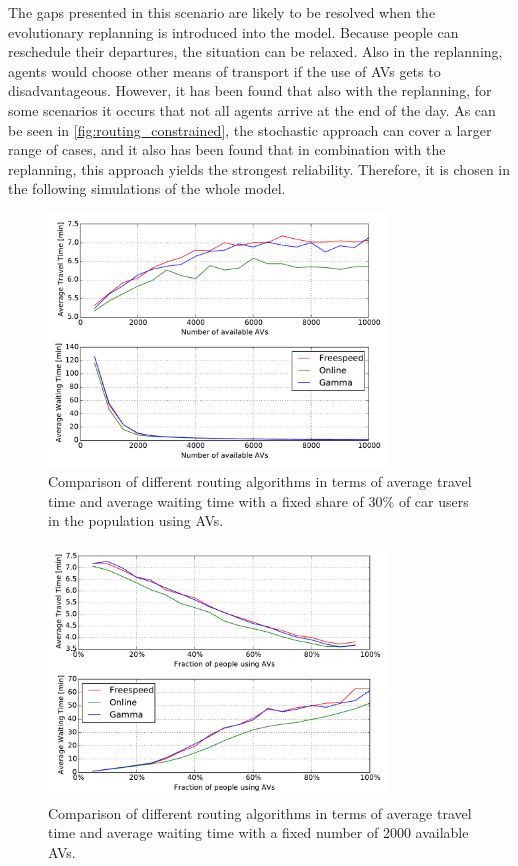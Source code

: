 The gaps presented in this scenario are likely to be resolved when the evolutionary
replanning is introduced into the model. Because people can reschedule
their departures, the situation can be relaxed. Also in the replanning, agents would
choose other means of transport if the use of AVs gets to disadvantageous. However,
it has been found that also with the replanning, for some scenarios it occurs that
not all agents arrive at the end of the day. As can be seen in \cref{fig:routing_constrained},
the stochastic approach can cover a larger range of cases, and it also has
been found that in combination with the replanning, this approach yields the strongest
reliability. Therefore, it is chosen in the following simulations of the whole
model.

\begin{figure}
    \centering
    \includegraphics[width=0.8\textwidth]{figures/relaxed_routing_fraction.pdf}
    \caption{Comparison of different routing algorithms in terms of average travel time and average
    waiting time with a fixed share of 30\% of car users in the population using AVs.}
    \label{fig:relaxed_routing_fraction}
\end{figure}

\begin{figure}
    \centering
    \includegraphics[width=0.8\textwidth]{figures/relaxed_routing_supply.pdf}
    \caption{Comparison of different routing algorithms in terms of average travel time and average
    waiting time with a fixed number of 2000 available AVs.}
    \label{fig:relaxed_routing_supply}
\end{figure}

